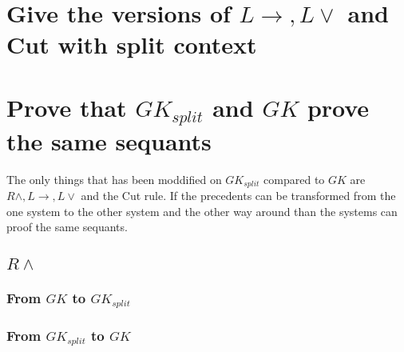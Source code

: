 \documentclass{article}
\begin{document}
\section{Give the versions of $L \to, L\vee$ and Cut with split context}
\begin{prooftree}
\end{prooftree}
\begin{prooftree}
\end{prooftree}
\begin{prooftree}
\end{prooftree}
\section{Prove that $GK_{split}$ and $GK$ prove the same sequants}
The only things that has been moddified on $GK_{split}$ compared to $GK$ are
$R\wedge, L \to, L\vee$ and the Cut rule.
If the precedents can be transformed from the one system to the other
system and the other way around than the systems can proof the same
sequants.

\subsection{$R\wedge$}
\subsubsection{From $GK$ to $GK_{split}$}
\begin{prooftree}
\end{prooftree}
\subsubsection{From $GK_{split}$ to $GK$}
\begin{prooftree}
\end{prooftree}
\end{document}
